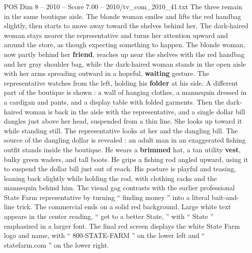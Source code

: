 \begin{textsample}{POS Dim 8 – 2010 – Score 7.00 – 2010/tv\_com\_2010\_41.txt}
The three remain in the same boutique aisle.
The blonde woman smiles and lifts the red handbag slightly, then starts to move away toward the shelves behind her.
The dark-haired woman stays nearer the representative and turns her attention upward and around the store, as though expecting something to happen.
The blonde woman, now partly behind her \textbf{friend}, reaches up near the shelves with the red handbag and her gray shoulder bag, while the dark-haired woman stands in the open aisle with her arms spreading outward in a hopeful, \textbf{waiting} gesture.
The representative watches from the left, holding his \textbf{folder} at his side.
A different part of the boutique is shown : a wall of hanging clothes, a mannequin dressed in a cardigan and pants, and a display table with folded garments.
Then the dark-haired woman is back in the aisle with the representative, and a single dollar bill dangles just above her head, suspended from a thin line.
She looks up toward it while standing still.
The representative looks at her and the dangling bill.
The source of the dangling dollar is revealed : an adult man in an exaggerated fishing outfit stands inside the boutique.
He wears a \textbf{brimmed} hat, a tan utility \textbf{vest}, bulky green waders, and tall boots.
He grips a fishing rod angled upward, using it to suspend the dollar bill just out of reach.
His posture is playful and teasing, leaning back slightly while holding the rod, with clothing racks and the mannequin behind him.
The visual gag contrasts with the earlier professional State Farm representative by turning “ finding money ” into a literal bait-and-line trick.
The commercial ends on a solid red background.
Large white text appears in the center reading, “ get to a better State, ” with “ State ” emphasized in a larger font.
The final red screen displays the white State Farm logo and name, with “ 800-STATE-FARM ” on the lower left and “ statefarm.com ” on the lower right.

\end{textsample}
